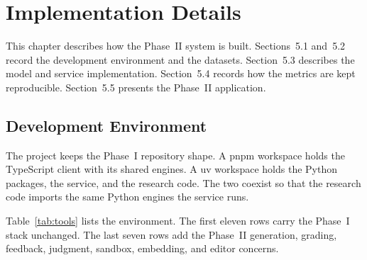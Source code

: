 \chapter{Implementation Details}
This chapter describes how the Phase~II system is built. Sections~5.1 and~5.2 record the development environment and the datasets. Section~5.3 describes the model and service implementation. Section~5.4 records how the metrics are kept reproducible. Section~5.5 presents the Phase~II application.

\section{Development Environment}
The project keeps the Phase~I repository shape. A pnpm workspace holds the TypeScript client with its shared engines. A uv workspace holds the Python packages, the service, and the research code. The two coexist so that the research code imports the same Python engines the service runs.

Table~\ref{tab:tools} lists the environment. The first eleven rows carry the Phase~I stack unchanged. The last seven rows add the Phase~II generation, grading, feedback, judgment, sandbox, embedding, and editor concerns.

